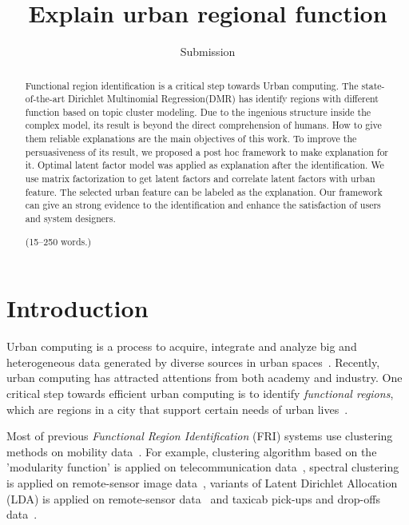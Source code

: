 \documentclass[runningheads]{llncs}
\begin{document}
\title{Explain urban regional function}
\author{Submission}

\maketitle

\begin{abstract}
Functional region identification is a critical step towards Urban computing.
The state-of-the-art Dirichlet Multinomial Regression(DMR) has identify regions with different function based on topic cluster modeling.
Due to the ingenious structure inside the complex model, its result is beyond the direct comprehension of humans.
How to give them reliable explanations are the main objectives of this work.
To improve the persuasiveness of its result, we proposed a post hoc framework to make explanation for it.
Optimal latent factor model was applied as explanation after the identification.
We use matrix factorization to get latent factors and correlate latent factors with urban feature.
The selected urban feature can be labeled as the explanation.
Our framework can give an strong evidence to the identification and enhance the satisfaction of users and system designers.

(15--250 words.)

\end{abstract}
%


\section{Introduction}
Urban computing is a process to acquire, integrate and analyze big and heterogeneous data generated by diverse sources in urban spaces~\cite{Zheng2014UrbanConcepts}. 
Recently, urban computing has attracted attentions from both academy and industry.
One critical step towards efficient urban computing is to identify \emph{functional regions}, which are regions in a city that support certain needs of urban lives~\cite{Yuan2012FunctionRegion,Yuan2015FunctionRegion}.

Most of previous \emph{Functional Region Identification} (FRI) systems use clustering methods on mobility data~\cite{Karlsson2006FunctionalRegionSummary}.
For example, clustering algorithm based on the 'modularity function' is applied on telecommunication data~\cite{Newman2004ModularityFunction,Ratti2010Telecom}, spectral clustering is applied on remote-sensor image data~\cite{Vatsavai2011Remote}, variants of Latent Dirichlet Allocation (LDA) is applied on remote-sensor data~\cite{Vatsavai2010Remote} and taxicab pick-ups and drop-offs data~\cite{Yuan2012FunctionRegion,Yuan2015FunctionRegion}.
\end{document}
